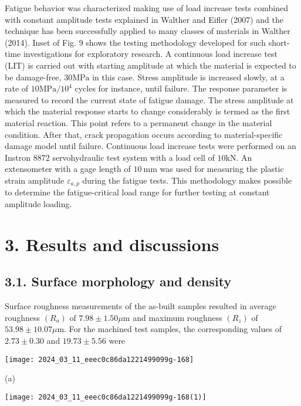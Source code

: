 \documentclass[10pt]{article}
\begin{document}
Fatigue behavior was characterized making use of load increase tests combined with constant amplitude tests explained in Walther and Eifler (2007) and the technique has been successfully applied to many classes of materials in Walther (2014). Inset of Fig. 9 shows the testing methodology developed for such short-time investigations for exploratory research. A continuous load increase test (LIT) is carried out with starting amplitude at which the material is expected to be damage-free, $30 \mathrm{MPa}$ in this case. Stress amplitude is increased slowly, at a rate of $10 \mathrm{MPa} / 10^{4}$ cycles for instance, until failure. The response parameter is measured to record the current state of fatigue damage. The stress amplitude at which the material response starts to change considerably is termed as the first material reaction. This point refers to a permanent change in the material condition. After that, crack propagation occurs according to material-specific damage model until failure. Continuous load increase tests were performed on an Instron 8872 servohydraulic test system with a load cell of $10 \mathrm{kN}$. An extensometer with a gage length of $10 \mathrm{~mm}$ was used for measuring the plastic strain amplitude $\varepsilon_{a, p}$ during the fatigue tests. This methodology makes possible to determine the fatigue-critical load range for further testing at constant amplitude loading.

\section*{3. Results and discussions}
\subsection*{3.1. Surface morphology and density}
Surface roughness measurements of the as-built samples resulted in average roughness $\left(R_{a}\right)$ of $7.98 \pm 1.50 \mu \mathrm{m}$ and maximum roughness $\left(R_{z}\right)$ of $53.98 \pm 10.07 \mu \mathrm{m}$. For the machined test samples, the corresponding values of $2.73 \pm 0.30$ and $19.73 \pm 5.56$ were

\begin{center}
\texttt{[image: 2024\_03\_11\_eeec0c86da1221499099g-168]}
\end{center}

(a)

\begin{center}
\texttt{[image: 2024\_03\_11\_eeec0c86da1221499099g-168(1)]}
\end{center}
\end{document}
